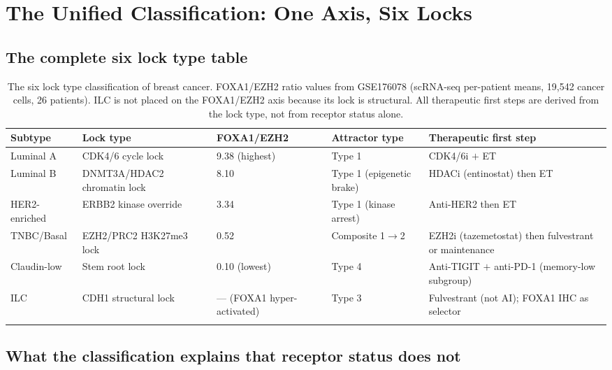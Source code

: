 \documentclass[12pt, a4paper]{article}
\begin{document}
\section{The Unified Classification: One Axis, Six Locks}

\subsection{The complete six lock type table}

\begin{center}
\begin{longtable}{p{1.8cm}p{2cm}p{2.5cm}p{2.5cm}p{4cm}}
\toprule
\textbf{Subtype}
& \textbf{Lock type}
& \textbf{FOXA1/EZH2}
& \textbf{Attractor type}
& \textbf{Therapeutic first step} \\
\midrule
\endhead
Luminal A
& CDK4/6 cycle lock
& 9.38 (highest)
& Type 1
& CDK4/6i $+$ ET \\[0.3em]
Luminal B
& DNMT3A/HDAC2 chromatin lock
& 8.10
& Type 1 (epigenetic brake)
& HDACi (entinostat) then ET \\[0.3em]
HER2-enriched
& ERBB2 kinase override
& 3.34
& Type 1 (kinase arrest)
& Anti-HER2 then ET \\[0.3em]
TNBC/Basal
& EZH2/PRC2 H3K27me3 lock
& 0.52
& Composite 1$\rightarrow$2
& EZH2i (tazemetostat) then fulvestrant
  or maintenance \\[0.3em]
Claudin-low
& Stem root lock
& 0.10 (lowest)
& Type 4
& Anti-TIGIT $+$ anti-PD-1
  (memory-low subgroup) \\[0.3em]
ILC
& CDH1 structural lock
& --- (FOXA1 hyper-activated)
& Type 3
& Fulvestrant (not AI);
  FOXA1 IHC as selector \\
\bottomrule
\caption{The six lock type classification of breast
cancer. FOXA1/EZH2 ratio values from GSE176078
(scRNA-seq per-patient means, 19,542 cancer cells,
26 patients). ILC is not placed on the FOXA1/EZH2
axis because its lock is structural. All therapeutic
first steps are derived from the lock type, not from
receptor status alone.}
\end{longtable}
\end{center}

\subsection{What the classification explains that
receptor status does not}
\end{document}
